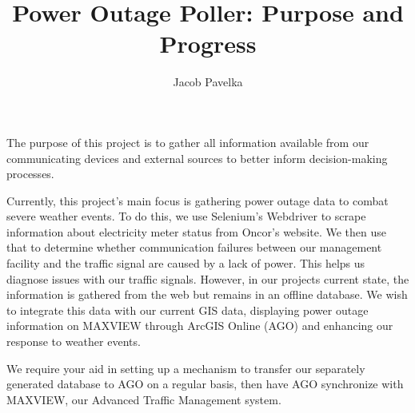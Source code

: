 \documentclass[]{article}
\title{Power Outage Poller: Purpose and Progress}
\author{Jacob Pavelka}
\begin{document}
\maketitle

The purpose of this project is to gather all information available from our communicating devices and external sources to better inform decision-making processes.

Currently, this project's main focus is gathering power outage data to combat severe weather events. To do this, we use Selenium's Webdriver to scrape information about electricity meter status from Oncor's website. We then use that to determine whether communication failures between our management facility and the traffic signal are caused by a lack of power. This helps us diagnose issues with our traffic signals. However, in our projects current state, the information is gathered from the web but remains in an offline database. We wish to integrate this data with our current GIS data, displaying power outage information on MAXVIEW through ArcGIS Online (AGO) and enhancing our response to weather events.

We require your aid in setting up a mechanism to transfer our separately generated database to AGO on a regular basis, then have AGO synchronize with MAXVIEW, our Advanced Traffic Management system.
\end{document}
